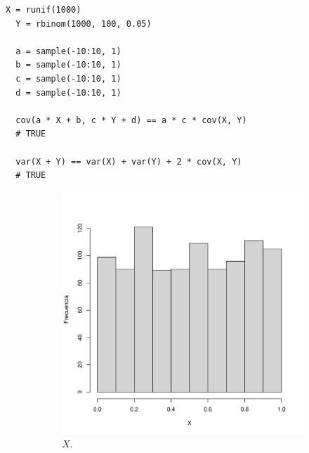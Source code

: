 \documentclass[paper=leter, fontsize=11pt]{scrartcl}
\begin{document}
\begin{lstlisting}[caption={Demostración numérica de propiedades de varianza y covarianza}, captionpos=t, label=prop]
  X = runif(1000)
  Y = rbinom(1000, 100, 0.05)

  a = sample(-10:10, 1)
  b = sample(-10:10, 1)
  c = sample(-10:10, 1)
  d = sample(-10:10, 1)

  cov(a * X + b, c * Y + d) == a * c * cov(X, Y)
  # TRUE

  var(X + Y) == var(X) + var(Y) + 2 * cov(X, Y)
  # TRUE
  \end{lstlisting}

\begin{figure}
  \begin{subfigure}{.5\textwidth}
      \centering
      \includegraphics[scale=0.4]{X.pdf}
      \caption{$X$.}
  \end{subfigure}
  \begin{subfigure}{0.5\textwidth}
      \centering

\end{subfigure}
\end{figure}
\end{document}
